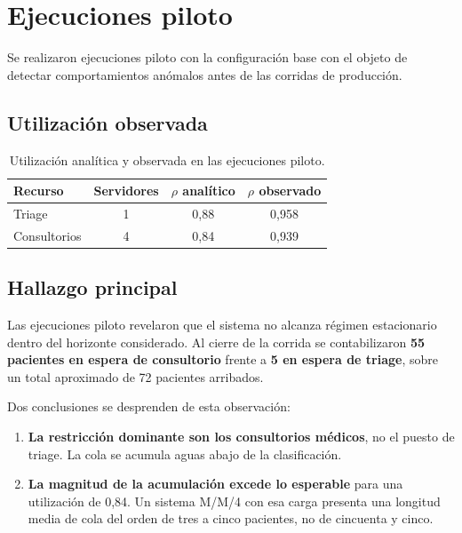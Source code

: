 \section{Ejecuciones piloto}
\label{sec:piloto}

Se realizaron ejecuciones piloto con la configuración base con el objeto de
detectar comportamientos anómalos antes de las corridas de producción.

\subsection{Utilización observada}

\begin{table}[H]
\centering
\begin{tabular}{lccc}
\toprule
\textbf{Recurso} & \textbf{Servidores} & \textbf{$\rho$ analítico} & \textbf{$\rho$ observado} \\
\midrule
Triage       & 1 & 0,88 & 0,958 \\
Consultorios & 4 & 0,84 & 0,939 \\
\bottomrule
\end{tabular}
\caption{Utilización analítica y observada en las ejecuciones piloto.}
\label{tab:piloto}
\end{table}

\subsection{Hallazgo principal}

Las ejecuciones piloto revelaron que el sistema no alcanza régimen
estacionario dentro del horizonte considerado. Al cierre de la corrida se
contabilizaron \textbf{55 pacientes en espera de consultorio} frente a
\textbf{5 en espera de triage}, sobre un total aproximado de 72 pacientes
arribados.

Dos conclusiones se desprenden de esta observación:

\begin{enumerate}
  \item \textbf{La restricción dominante son los consultorios médicos}, no el
  puesto de triage. La cola se acumula aguas abajo de la clasificación.
  \item \textbf{La magnitud de la acumulación excede lo esperable} para una
  utilización de 0,84. Un sistema M/M/4 con esa carga presenta una longitud
  media de cola del orden de tres a cinco pacientes, no de cincuenta y cinco.
\end{enumerate}

